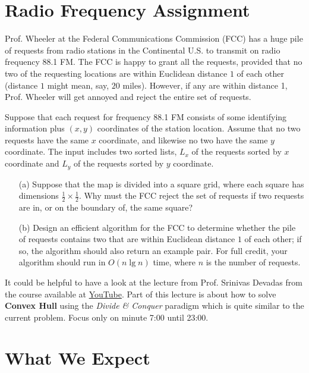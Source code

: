 \documentclass[12pt]{article}
\begin{document}
\section{Radio Frequency Assignment}\label{sec:assignment}
Prof. Wheeler at the Federal Communications Commission (FCC) has a huge pile of requests from radio stations in the Continental U.S. to transmit on radio frequency 88.1 FM. The FCC is happy to grant all the requests, provided that no two of the requesting locations are within Euclidean distance $1$ of each other (distance $1$ might mean, say, $20$ miles). However, if any are within distance 1, Prof. Wheeler will get annoyed and reject the entire set of requests.

Suppose that each request for frequency 88.1 FM consists of some identifying information plus $(x, y)$ coordinates of the station location. Assume that no two requests have the same $x$ coordinate, and likewise no two have the same $y$ coordinate. The input includes two sorted lists, $L_x$ of the requests sorted by $x$ coordinate and $L_y$ of the requests sorted by $y$ coordinate.

\begin{enumerate}
    \item[(a)] Suppose that the map is divided into a square grid, where each square has dimensions $\frac{1}{2} \times \frac{1}{2}$. Why must the FCC reject the set of requests if two requests are in, or on the boundary of, the same square?

    \item[(b)] Design an efficient algorithm for the FCC to determine whether the pile of requests contains two that are within Euclidean distance $1$ of each other; if so, the algorithm should also return an example pair. For full credit, your algorithm should run in $O(n \lg n)$ time, where $n$ is the number of requests.
\end{enumerate}

\begin{tcolorbox}[title=Note]
  It could be helpful to have a look at the lecture from Prof. Srinivas Devadas from the course available at \href{https://youtu.be/EzeYI7p9MjU?si=VGDHQfO3l3yC_FwU}{YouTube}.  Part of this lecture is about how to solve \textbf{Convex Hull} using the \textit{Divide \& Conquer} paradigm which is quite similar to the current problem.  Focus only on minute 7:00 until 23:00.
\end{tcolorbox}

\section{What We Expect}
\end{document}
